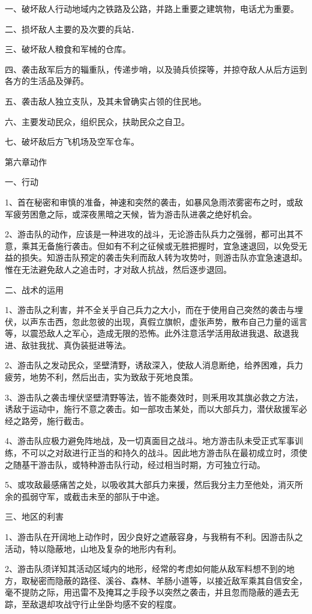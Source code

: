一、破坏敌人行动地域内之铁路及公路，并路上重要之建筑物，电话尤为重要。

二、损坏敌人主要的及次要的兵站．

三、破坏敌人粮食和军械的仓库。

四、袭击敌军后方的辎重队，传递步哨，以及骑兵侦探等，并掠夺敌人从后方运到各方的生活品及弹药。

五、袭击敌人独立支队，及其未曾确实占领的住民地。

六、主要发动民众，组织民众，扶助民众之自卫。

七、破坏敌后方飞机场及空军仓车。

第六章动作

一、行动

1、首在秘密和审慎的准备，神速和突然的袭击，如暴风急雨浓雾密布之时，或敌军疲劳困惫之际，或深夜黑暗之天候，皆为游击队进袭之绝好机会。

2、游击队的动作，应该是一种进攻的战斗，无论游击队兵力之强弱，都可出其不意，乘其无备施行袭击。但如有不利之征候或无胜把握时，宜急速退回，以免受无益的损失。知游击队预定的袭击失利而敌人转为攻势吋，则游击队亦宜急速退却。惟在无法避免敌人之追击时，才对敌人抗战，然后逐步退回。

二、战术的运用

1、游击队之利害，并不全关乎自己兵力之大小，而在于使用自己突然的袭击与埋伏，以声东击西，忽此忽彼的出现，真假立旗帜，虚张声势，散布自己力量的谣言等，以震恐敌人之军心，造成无限的恐怖。此外注意活学活用敌进我退、敌退我进、敌驻我扰、真伪装挺进等法。

2、游击队之发动民众，坚壁清野，诱敌深入，使敌人消息断绝，给养困难，兵力疲劳，地势不利，然后出击，实为致敌于死地良策。

3、游击队之袭击埋伏坚壁清野等法，皆不能奏效时，则釆用攻其旗必救之方法，诱敌于运动中，施行不意之袭击。如一部攻击某处，而以大部兵力，潜伏敌援军必经之路旁，施行截击。

4、游击队应极力避免阵地战，及一切真面目之战斗。地方游击队未受正式军事训练，不可以之对敌进行正当的和持久的战斗。因此地方游击队在最初成立时，须使之随基干游击队，或特种游击队行动，经过相当时期，方可独立行动。

5、或攻敌最感痛苦之处，以吸收其大部兵力来援，然后我分主力至他处，消灭所余的孤弱守军，或截击未至的部队于中途。

三、地区的利害

1、游击队在开阔地上动作时，因少良好之遮蔽容身，与我稍有不利。因游击队之活动，特以隐蔽地，山地及复杂的地形内有利。

2、游击队须详知其活动区域内的地形，经常的考虑如何能从敌军料想不到的地方，取秘密而隐蔽的路径、溪谷、森林、羊肠小道等，以接近敌军乘其自信安全，毫不提防之际，用迅雷不及掩耳之手段予以突然之袭击，并且忽而隐蔽的遁去无踪，至敌退却攻战守行止坐卧均感不安的程度。

